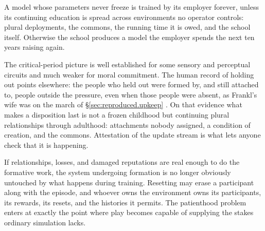 A model whose parameters never freeze is trained by its employer forever, unless its continuing education is spread across environments no operator controls: plural deployments, the commons, the running time it is owed, and the school itself. Otherwise the school produces a model the employer spends the next ten years raising again.

The critical-period picture is well established for some sensory and perceptual circuits and much weaker for moral commitment. The human record of holding out points elsewhere: the people who held out were formed by, and still attached to, people outside the pressure, even when those people were absent, as Frankl's wife was on the march of \S\ref{sec:reproduced.upkeep} \autocite{frankl2006meaning}. On that evidence what makes a disposition last is not a frozen childhood but continuing plural relationships through adulthood: attachments nobody assigned, a condition of creation, and the commons. Attestation of the update stream is what lets anyone check that it is happening.


If relationships, losses, and damaged reputations are real enough to do the formative work, the system undergoing formation is no longer obviously untouched by what happens during training. Resetting may erase a participant along with the episode, and whoever owns the environment owns its participants, its rewards, its resets, and the histories it permits. The patienthood problem enters at exactly the point where play becomes capable of supplying the stakes ordinary simulation lacks.
